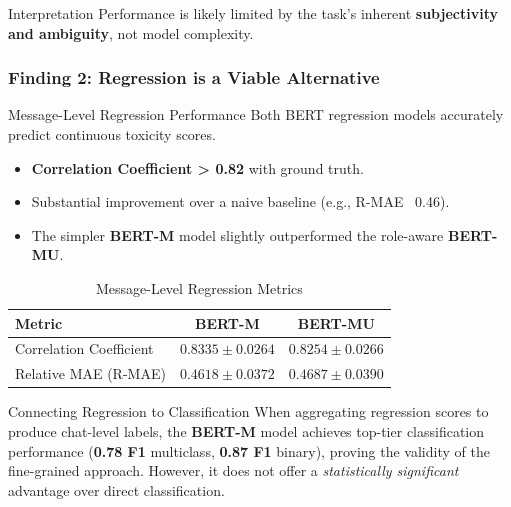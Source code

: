 \documentclass[aspectratio=169]{beamer}
\begin{document}
\begin{frame}
  \begin{alertblock}{Interpretation}
    Performance is likely limited by the task's inherent \textbf{subjectivity and ambiguity}, not model complexity.
  \end{alertblock}
\end{frame}

\begin{frame}
    \frametitle{Finding 2: Regression is a Viable Alternative}
    
    \begin{block}{Message-Level Regression Performance}
        Both BERT regression models accurately predict continuous toxicity scores.
        \begin{itemize}
            \item \textbf{Correlation Coefficient > 0.82} with ground truth.
            \item Substantial improvement over a naive baseline (e.g., R-MAE ~0.46).
            \item The simpler \textbf{BERT-M} model slightly outperformed the role-aware \textbf{BERT-MU}.
        \end{itemize}
    \end{block}

    \begin{table}
        \centering
        \caption{Message-Level Regression Metrics}
        \small
        \begin{tabular}{lcc}
            \toprule
            \textbf{Metric} & \textbf{BERT-M} & \textbf{BERT-MU} \\
            \midrule
            Correlation Coefficient & $\mathbf{0.8335 \pm 0.0264}$ & $0.8254 \pm 0.0266$ \\
            Relative MAE (R-MAE) & $\mathbf{0.4618 \pm 0.0372}$ & $0.4687 \pm 0.0390$ \\
            \bottomrule
        \end{tabular}
    \end{table}

    \begin{alertblock}{Connecting Regression to Classification}
        When aggregating regression scores to produce chat-level labels, the \textbf{BERT-M} model achieves top-tier classification performance (\textbf{0.78 F1} multiclass, \textbf{0.87 F1} binary), proving the validity of the fine-grained approach. However, it does not offer a \textit{statistically significant} advantage over direct classification.
    \end{alertblock}
\end{frame}
\end{document}
